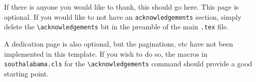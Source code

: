 If there is anyone you would like to thank, this should go here.  
 This page is optional.  
 If you would like to not have an \texttt{acknowledgements} section, simply delete the \texttt{\textbackslash acknowledgements{}} bit in the preamble of the main \texttt{.tex} file.
 
A dedication page is also optional, but the paginations, etc have not been implemented in this template.
 If you wish to do so, the macros in \texttt{southalabama.cls} for the \texttt{\textbackslash acknowledgements{}} command should provide a good starting point.
